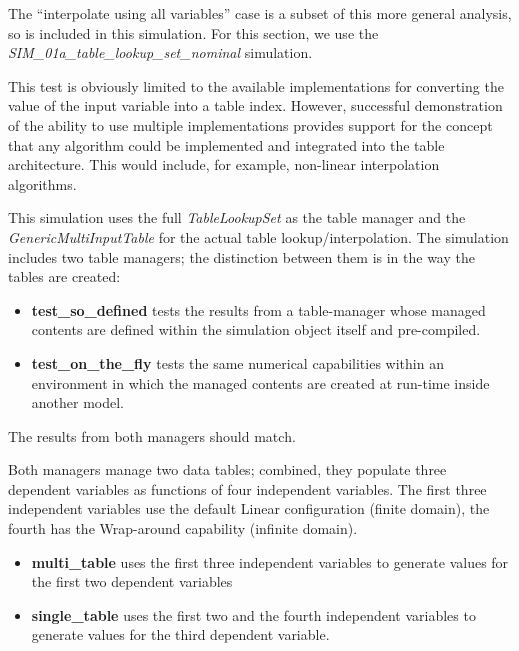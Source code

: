 \documentclass[11pt,fleqn]{report}
\begin{document}
The ``interpolate using all variables''
case is a subset of this more general analysis, so is included in this
simulation.  For this section, we use the
\textit{SIM\_01a\_table\_lookup\_set\_nominal} simulation.

This test is obviously limited to the available implementations for
converting the value of the input variable into a table index.  However,
successful demonstration of the ability to use multiple implementations
provides support for the concept that any algorithm could be implemented and
integrated into the table architecture.  This would include, for example,
non-linear interpolation algorithms.


This simulation uses the full \textit{TableLookupSet} as the table manager
and the \textit{GenericMultiInputTable} for the actual table
lookup/interpolation.  The simulation includes two table managers; the
distinction between them is in the way the tables are created:
\begin{itemize}
  \item \textbf{test\_so\_defined} tests the results from a table-manager
  whose managed contents are defined within the simulation object itself and
  pre-compiled.
  \item \textbf{test\_on\_the\_fly} tests the same numerical capabilities
  within an environment in which the managed contents are created at
  run-time inside another model.
\end{itemize}
The results from both managers should match.

Both managers manage two data tables; combined, they populate three dependent
variables
as functions of four independent variables. The first three independent
variables use the default Linear configuration (finite domain), the fourth
has the Wrap-around capability (infinite domain).

\begin{itemize}
  \item \textbf{multi\_table} uses the first three independent variables to
  generate values for the first two dependent variables
  \item \textbf{single\_table} uses the first two and the fourth independent
  variables to generate values for the third dependent variable.
\end{itemize}
\end{document}
